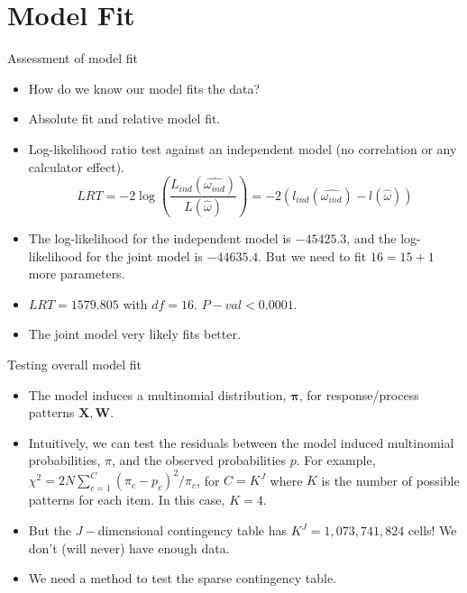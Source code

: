 \documentclass[xcolor=dvipsnames,12pt]{beamer}
\begin{document}
  \section{Model Fit}
  \begin{frame}{Assessment of model fit}
    \begin{itemize}
      \item How do we know our model fits the data?
      \item Absolute fit and relative model fit.
      \item Log-likelihood ratio test against an independent model (no correlation or any calculator effect).
      \begin{equation}
        LRT = -2 \log \left(\frac{L_{ind}(\hat{\omega_{ind}})}{L(\hat{\omega})}\right) = -2 (l_{ind}(\hat{\omega_{ind}}) - l(\hat{\omega}))
      \end{equation}
      \item The log-likelihood for the independent model is $-45425.3$, and the log-likelihood for the joint model is $-44635.4$. But we need to fit $16=15+1$ more parameters.
      \item $LRT = 1579.805$ with $df = 16$. $P-val < 0.0001$.
      \item The joint model very likely fits better.
    \end{itemize}
  \end{frame}

  \begin{frame}{Testing overall model fit}
    \begin{itemize}
      \item The model induces a multinomial distribution, $\bm{\pi}$, for response/process patterns ${\bm{X}, \bm{W}}$.
      \item Intuitively, we can test the residuals between the model induced multinomial probabilities, $\pi$, and the observed probabilities $p$. For example, $\chi^2 = 2N \sum_{c=1}^{C}(\pi_c - p_c)^2/\pi_c$, for $C = K^J$ where $K$ is the number of possible patterns for each item. In this case, $K = 4$.
      \item But the $J-$dimensional contingency table has $K^J = 1,073,741,824$ cells! We don't (will never) have enough data.
      \item We need a method to test the sparse contingency table.
    \end{itemize}
  \end{frame}
\end{document}
